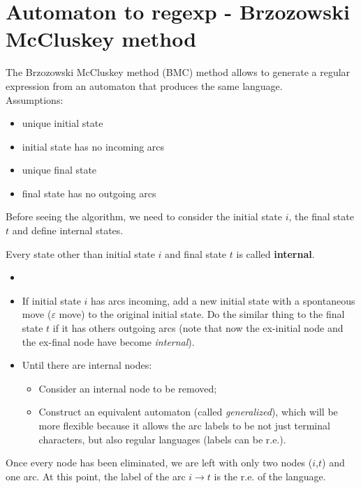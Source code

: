 	\section{Automaton to regexp - Brzozowski McCluskey method}
		The Brzozowski McCluskey method (BMC) method allows to generate a regular expression from an automaton that produces the same language.\\
		Assumptions:
		\begin{itemize}
			\item unique initial state
			\item initial state has no incoming arcs
			\item unique final state
			\item final state has no outgoing arcs
		\end{itemize}
		Before seeing the algorithm, we need to consider the initial state $i$, the final state $t$ and define internal states.
		\begin{definition}
			Every state other than initial state $i$ and final state $t$ is called \textbf{internal}.
		\end{definition}
		\begin{algorithm}
			\begin{itemize}
				\item[]
				\item If initial state $i$ has arcs incoming, add a new initial state with a spontaneous move ($\varepsilon$ move) to the original initial state. Do the
				similar thing to the final state $t$ if it has others outgoing arcs (note that now the ex-initial node and the ex-final node have become \emph{internal}).
				\item Until there are internal nodes:
				\begin{itemize}
					\item Consider an internal node to be removed;
					\item Construct an equivalent automaton (called \emph{generalized}), which will be more flexible because it allows the arc labels to be not just
					terminal characters, but also regular languages (labels can be r.e.).
				\end{itemize}
			\end{itemize}
			Once every node has been eliminated, we are left with only two nodes ($i$,$t$) and one arc. At this point, the label of the arc $i\longrightarrow t$ is the 
			r.e. of the language.
		\end{algorithm}
